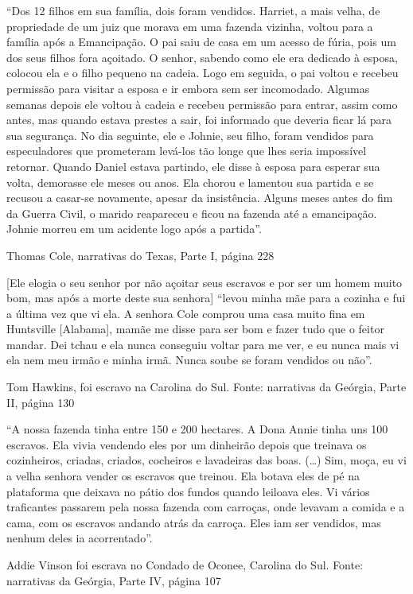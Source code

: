 ``Dos 12 filhos em sua família, dois foram vendidos. Harriet, a mais
velha, de propriedade de um juiz que morava em uma fazenda vizinha,
voltou para a família após a Emancipação. O pai saiu de casa em um
acesso de fúria, pois um dos seus filhos fora açoitado. O senhor,
sabendo como ele era dedicado à esposa, colocou ela e o filho pequeno na
cadeia. Logo em seguida, o pai voltou e recebeu permissão para visitar a
esposa e ir embora sem ser incomodado. Algumas semanas depois ele voltou
à cadeia e recebeu permissão para entrar, assim como antes, mas quando
estava prestes a sair, foi informado que deveria ficar lá para sua
segurança. No dia seguinte, ele e Johnie, seu filho, foram vendidos para
especuladores que prometeram levá-los tão longe que lhes seria
impossível retornar. Quando Daniel estava partindo, ele disse à esposa
para esperar sua volta, demorasse ele meses ou anos. Ela chorou e
lamentou sua partida e se recusou a casar-se novamente, apesar da
insistência. Alguns meses antes do fim da Guerra Civil, o marido
reapareceu e ficou na fazenda até a emancipação. Johnie morreu em um
acidente logo após a partida''.

Thomas Cole, narrativas do Texas, Parte I, página 228

{[}Ele elogia o seu senhor por não açoitar seus escravos e por ser um
homem muito bom, mas após a morte deste sua senhora{]} ``levou minha mãe
para a cozinha e fui a última vez que vi ela. A senhora Cole comprou uma
casa muito fina em Huntsville {[}Alabama{]}, mamãe me disse para ser bom
e fazer tudo que o feitor mandar. Dei tchau e ela nunca conseguiu voltar
para me ver, e eu nunca mais vi ela nem meu irmão e minha irmã. Nunca
soube se foram vendidos ou não''.

Tom Hawkins, foi escravo na Carolina do Sul. Fonte: narrativas da
Geórgia, Parte II, página 130

``A nossa fazenda tinha entre 150 e 200 hectares. A Dona Annie tinha uns
100 escravos. Ela vivia vendendo eles por um dinheirão depois que
treinava os cozinheiros, criadas, criados, cocheiros e lavadeiras das
boas. (\ldots{}) Sim, moça, eu vi a velha senhora vender os escravos que
treinou. Ela botava eles de pé na plataforma que deixava no pátio dos
fundos quando leiloava eles. Vi vários traficantes passarem pela nossa
fazenda com carroças, onde levavam a comida e a cama, com os escravos
andando atrás da carroça. Eles iam ser vendidos, mas nenhum deles ia
acorrentado''.

Addie Vinson foi escrava no Condado de Oconee, Carolina do Sul. Fonte:
narrativas da Geórgia, Parte IV, página 107

